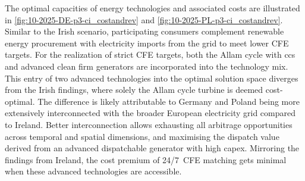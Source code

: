 The optimal capacities of energy technologies and associated costs are illustrated in \cref{fig:10-2025-DE-p3-ci_costandrev} and \cref{fig:10-2025-PL-p3-ci_costandrev}.
Similar to the Irish scenario, participating consumers complement renewable energy procurement with electricity imports from the grid to meet lower CFE targets. 
For the realization of strict CFE targets, both the Allam cycle with \gls{ccs} and advanced clean firm generators are incorporated into the technology mix. 
This entry of two advanced technologies into the optimal solution space diverges from the Irish findings, where solely the Allam cycle turbine is deemed cost-optimal. 
The difference is likely attributable to Germany and Poland being more extensively interconnected with the broader European electricity grid compared to Ireland. 
Better interconnection allows exhausting all arbitrage opportunities across temporal and spatial dimensions, and maximising the dispatch value derived from an advanced dispatchable generator with high \gls{capex}.
Mirroring the findings from Ireland, the cost premium of 24/7~CFE matching gets minimal when these advanced technologies are accessible.


